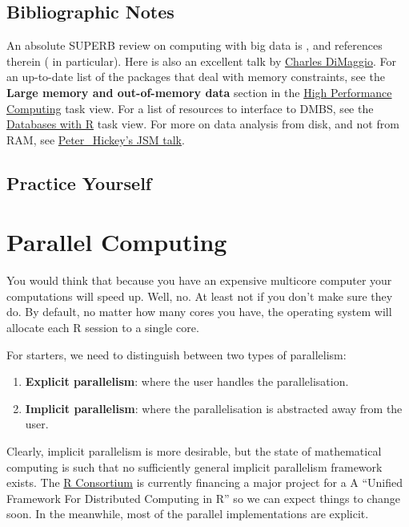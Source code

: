 \documentclass[]{book}
\providecommand{\tightlist}{%
  \setlength{\itemsep}{0pt}\setlength{\parskip}{0pt}}
\theoremstyle{definition}
\theoremstyle{definition}
\theoremstyle{definition}
\theoremstyle{remark}
\begin{document}
\section{Bibliographic Notes}\label{bibliographic-notes-12}

An absolute SUPERB review on computing with big data is
\citet{wang2015statistical}, and references therein
(\citet{kane2013scalable} in particular). Here is also an excellent talk
by
\href{http://www.columbia.edu/~sjm2186/EPIC_R/EPIC_R_BigData.pdf}{Charles
DiMaggio}. For an up-to-date list of the packages that deal with memory
constraints, see the \textbf{Large memory and out-of-memory data}
section in the
\href{https://cran.r-project.org/web/views/HighPerformanceComputing.html}{High
Performance Computing} task view. For a list of resources to interface
to DMBS, see the
\href{https://cran.r-project.org/web/views/Databases.html}{Databases
with R} task view. For more on data analysis from disk, and not from
RAM, see
\href{https://www.peterhickey.org/slides/2017/2017-08-01_Peter_Hickey_JSM.pdf}{Peter\_Hickey's
JSM talk}.

\section{Practice Yourself}\label{practice-yourself-11}

\chapter{Parallel Computing}\label{parallel}

You would think that because you have an expensive multicore computer
your computations will speed up. Well, no. At least not if you don't
make sure they do. By default, no matter how many cores you have, the
operating system will allocate each R session to a single core.

For starters, we need to distinguish between two types of parallelism:

\begin{enumerate}
\def\labelenumi{\arabic{enumi}.}
\tightlist
\item
  \textbf{Explicit parallelism}: where the user handles the
  parallelisation.
\item
  \textbf{Implicit parallelism}: where the parallelisation is abstracted
  away from the user.
\end{enumerate}

Clearly, implicit parallelism is more desirable, but the state of
mathematical computing is such that no sufficiently general implicit
parallelism framework exists. The
\href{https://www.r-consortium.org/projects/awarded-projects}{R
Consortium} is currently financing a major project for a A ``Unified
Framework For Distributed Computing in R'' so we can expect things to
change soon. In the meanwhile, most of the parallel implementations are
explicit.
\end{document}

